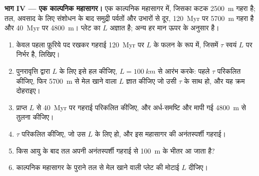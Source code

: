 \begin{problem}
\medskip\noindent\textbf{भाग IV --- एक काल्पनिक महासागर।} एक काल्पनिक महासागर में, जिसका
कटक \qty{2500}{m} गहरा है; तल, अवसाद के लिए संशोधन के बाद
समुद्री पर्वतों और उभारों से दूर, \qty{120}{Myr} पर \qty{5700}{m} गहरा है और
\qty{40}{Myr} पर \qty{4800}{m}। प्लेट का $L$ अज्ञात है; अन्य हर मान
ऊपर के अनुसार है।
\begin{enumerate}[resume]
  \item केवल पहला फ़ूरिये पद रखकर गहराई
        \qty{120}{Myr} पर $L$ के फलन के रूप में, जिसमें $\tau$ स्वयं
        $L$ पर निर्भर है, लिखिए।
  \item पुनरावृत्ति द्वारा $L$ के लिए इसे हल कीजिए, $L = \qty{100}{km}$ से आरंभ करके:
        पहले $\tau$ परिकलित कीजिए, फिर \qty{5700}{m} से मेल खाने वाला $L$
        ज्ञात कीजिए जो उसी $\tau$ के साथ हो, और यह क्रम दोहराइए।
  \item प्राप्त $L$ से \qty{40}{Myr} पर गहराई परिकलित कीजिए, और
        अर्ध-समष्टि और मापी गई \qty{4800}{m} से तुलना कीजिए।
  \item $\tau$ परिकलित कीजिए, जो उस $L$ के लिए हो, और इस महासागर की अनंतस्पर्शी गहराई।
  \item किस आयु के बाद तल अपनी अनंतस्पर्शी गहराई से
        \qty{100}{m} के भीतर आ जाता है?
  \item काल्पनिक महासागर के पुराने तल से मेल खाने वाली प्लेट की मोटाई
        $L$ दीजिए।
\end{enumerate}
\end{problem}
